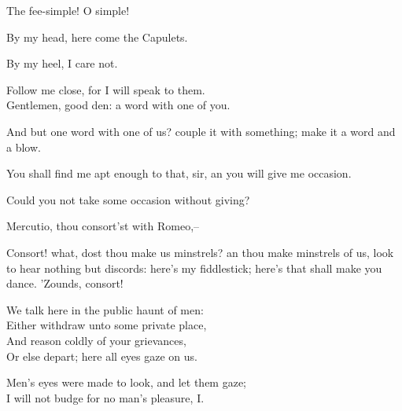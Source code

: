 \begin{speech}
The fee-simple!   O simple!
\end{speech}
\begin{speech}
By my head, here come the Capulets.
\end{speech}
\begin{speech}
By my heel, I care not. 
\end{speech}
\begin{speech}
Follow me close, for I will speak to them. \\
Gentlemen, good den: a word with one of you. \\
\end{speech}
\begin{speech}
And but one word with one of us?
couple it with something; make it a word and
a blow.
\end{speech}
\begin{speech}
You shall find me apt enough to that,
sir, an you will give me occasion.
\end{speech}
\begin{speech}
Could you not take some occasion
without giving?
\end{speech}
\begin{speech}
Mercutio, thou consort'st with Romeo,--
\end{speech}
\begin{speech}
Consort! what, dost thou make us
 minstrels? an thou make minstrels of us, look
 to hear nothing but discords: here's my fiddlestick;
here's that shall make you dance.
'Zounds, consort!
\end{speech}
\begin{speech}
We talk here in the public haunt of men: \\
Either withdraw unto some private place, \\
And reason coldly of your grievances, \\
Or else depart; here all eyes gaze on us. \\
\end{speech}
\begin{speech}
Men's eyes were made to look, and let them gaze; \\

I will not budge for no man's pleasure, I. 
\\
\end{speech}
